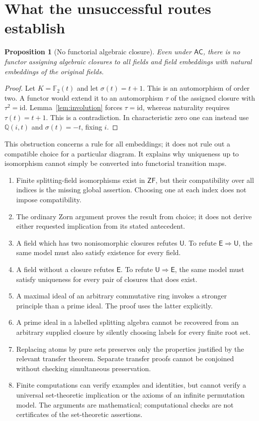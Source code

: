 \documentclass[11pt,a4paper]{article}
\newtheorem{proposition}[theorem]{Proposition}
\theoremstyle{definition}\newtheorem{definition}[theorem]{Definition}
\theoremstyle{remark}\newtheorem{remark}[theorem]{Remark}
\newcommand{\ZF}{\mathsf{ZF}}\newcommand{\ZFA}{\mathsf{ZFA}}
\newcommand{\AC}{\mathsf{AC}}\newcommand{\BPI}{\mathsf{BPI}}
\newcommand{\E}{\mathsf E}\newcommand{\U}{\mathsf U}
\newcommand{\Q}{\mathbb Q}\newcommand{\F}{\mathbb F}
\begin{document}
\section{What the unsuccessful routes establish}
\begin{proposition}[No functorial algebraic closure]\label{prop:nofunctor}
Even under $\AC$, there is no functor assigning algebraic closures to all fields and field embeddings with natural embeddings of the original fields.
\end{proposition}
\begin{proof}
Let $K=\F_2(t)$ and let $\sigma(t)=t+1$. This is an automorphism of order two. A functor would extend it to an automorphism $\tau$ of the assigned closure with $\tau^2=\mathrm{id}$. Lemma~\ref{lem:involution} forces $\tau=\mathrm{id}$, whereas naturality requires $\tau(t)=t+1$. This is a contradiction. In characteristic zero one can instead use $\Q(i,t)$ and $\sigma(t)=-t$, fixing $i$.
\end{proof}

This obstruction concerns a rule for all embeddings; it does not rule out a compatible choice for a particular diagram. It explains why uniqueness up to isomorphism cannot simply be converted into functorial transition maps.

\begin{enumerate}
\item Finite splitting-field isomorphisms exist in $\ZF$, but their compatibility over all indices is the missing global assertion. Choosing one at each index does not impose compatibility.
\item The ordinary Zorn argument proves the result from choice; it does not derive either requested implication from its stated antecedent.
\item A field which has two nonisomorphic closures refutes $\U$. To refute $\E\Rightarrow\U$, the same model must also satisfy existence for every field.
\item A field without a closure refutes $\E$. To refute $\U\Rightarrow\E$, the same model must satisfy uniqueness for every pair of closures that does exist.
\item A maximal ideal of an arbitrary commutative ring invokes a stronger principle than a prime ideal. The proof uses the latter explicitly.
\item A prime ideal in a labelled splitting algebra cannot be recovered from an arbitrary supplied closure by silently choosing labels for every finite root set.
\item Replacing atoms by pure sets preserves only the properties justified by the relevant transfer theorem. Separate transfer proofs cannot be conjoined without checking simultaneous preservation.
\item Finite computations can verify examples and identities, but cannot verify a universal set-theoretic implication or the axioms of an infinite permutation model. The arguments are mathematical; computational checks are not certificates of the set-theoretic assertions.
\end{enumerate}
\end{document}
